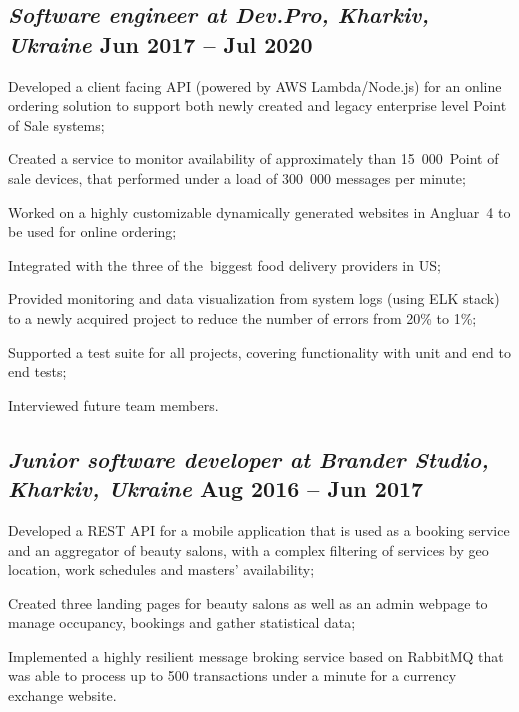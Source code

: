 \documentclass[a4paper,12pt]{book}
\begin{document}
\subsection{{\sl\bf\hspace{0.1in}Software engineer at Dev.Pro, Kharkiv, Ukraine} \hfill Jun 2017 -- Jul 2020}
\begin{zitemize}
 \item Developed a client facing API (powered by AWS Lambda/Node.js) for an online ordering solution to support both newly created and legacy enterprise level Point of Sale systems;
 \item Created a service to monitor availability of approximately than 15~000~Point of sale devices, that performed under a load of 300~000 messages per minute;
 \item Worked on a highly customizable dynamically generated websites in Angluar~4 to be used for online ordering;
 \item Integrated with the three of the~biggest food delivery providers in US;
 \item Provided monitoring and data visualization from system logs (using ELK stack) to a newly acquired project to reduce the number of errors from 20\% to 1\%;
 \item Supported a test suite for all projects, covering functionality with unit and end to end tests;
 \item Interviewed future team members.
\end{zitemize}

\subsection{{\sl\bf\hspace{0.1in} Junior software developer at Brander Studio, Kharkiv, Ukraine} \hfill Aug 2016 -- Jun 2017}
\begin{zitemize}
 \item Developed a REST API for a mobile application that is used as a booking service and an aggregator of beauty salons, with a complex filtering of services by geo location, work schedules and masters' availability;
 \item Created three landing pages for beauty salons as well as an admin webpage to manage occupancy, bookings and gather statistical data;
 \item Implemented a highly resilient message broking service based on RabbitMQ that was able to process up to 500 transactions under a minute for a currency exchange website.
\end{zitemize}
\end{document}
